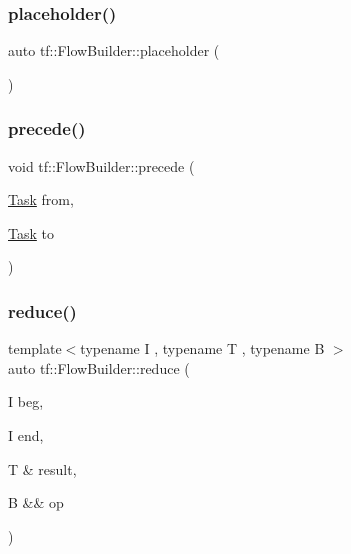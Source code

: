 \subsubsection{\texorpdfstring{placeholder()}{placeholder()}}
{\footnotesize\ttfamily auto tf\+::\+Flow\+Builder\+::placeholder (\begin{DoxyParamCaption}{ }\end{DoxyParamCaption})\hspace{0.3cm}{\ttfamily [inline]}}

\mbox{\label{classtf_1_1FlowBuilder_a6888a33d7b1a6df27b502f5dc736305e}} 
\subsubsection{\texorpdfstring{precede()}{precede()}}
{\footnotesize\ttfamily void tf\+::\+Flow\+Builder\+::precede (\begin{DoxyParamCaption}\item[{\hyperlink{classtf_1_1Task}{Task}}]{from,  }\item[{\hyperlink{classtf_1_1Task}{Task}}]{to }\end{DoxyParamCaption})\hspace{0.3cm}{\ttfamily [inline]}}

\mbox{\label{classtf_1_1FlowBuilder_a977deae532c85dca046658a0048daa8e}} 
\subsubsection{\texorpdfstring{reduce()}{reduce()}}
{\footnotesize\ttfamily template$<$typename I , typename T , typename B $>$ \\
auto tf\+::\+Flow\+Builder\+::reduce (\begin{DoxyParamCaption}\item[{I}]{beg,  }\item[{I}]{end,  }\item[{T \&}]{result,  }\item[{B \&\&}]{op }\end{DoxyParamCaption})}

\mbox{\label{classtf_1_1FlowBuilder_aed9365d31c3f897cf5c45fb7ea917aa1}} 
